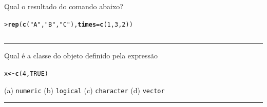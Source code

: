 \documentclass[a4paper,11pt,fleqn]{article}\usepackage[]{graphicx}\usepackage[]{color}
\makeatletter
\newcommand{\hlnum}[1]{\textcolor[rgb]{0,0,0}{#1}}%
\newcommand{\hlstr}[1]{\textcolor[rgb]{0,0,0}{#1}}%
\newcommand{\hlstd}[1]{\textcolor[rgb]{0,0,0}{#1}}%
\newcommand{\hlkwb}[1]{\textcolor[rgb]{0,0,0}{\textbf{#1}}}%
\newcommand{\hlkwc}[1]{\textcolor[rgb]{0,0,0}{\textbf{#1}}}%
\newcommand{\hlkwd}[1]{\textcolor[rgb]{0,0,0}{\textbf{#1}}}%
\newenvironment{kframe}{%
 \def\at@end@of@kframe{}%
 \ifinner\ifhmode%
  \def\at@end@of@kframe{\end{minipage}}%
  \begin{minipage}{\columnwidth}%
 \fi\fi%
 \def\FrameCommand##1{\hskip\@totalleftmargin \hskip-\fboxsep
 \colorbox{shadecolor}{##1}\hskip-\fboxsep
     \hskip-\linewidth \hskip-\@totalleftmargin \hskip\columnwidth}%
 \MakeFramed {\advance\hsize-\width
   \@totalleftmargin\z@ \linewidth\hsize
   \@setminipage}}%
 {\par\unskip\endMakeFramed%
 \at@end@of@kframe}
\newenvironment{knitrout}{}{} %
\theoremstyle{definition}
\makeatother
\begin{document}
\begin{compactenum}[3.]
\item Qual o resultado do comando abaixo?
\begin{knitrout}\small
{}\color{fgcolor}\begin{kframe}
\begin{alltt}
\hlstd{> }\hlkwd{rep}\hlstd{(}\hlkwd{c}\hlstd{(}\hlstr{"A"}\hlstd{,} \hlstr{"B"}\hlstd{,} \hlstr{"C"}\hlstd{),} \hlkwc{times} \hlstd{=} \hlkwd{c}\hlstd{(}\hlnum{1}\hlstd{,} \hlnum{3}\hlstd{,} \hlnum{2}\hlstd{))}
\end{alltt}
\end{kframe}
\end{knitrout}
\begin{tabular}{| p{1cm} | p{1cm} | p{1cm} | p{1cm} | p{1cm} | p{1cm}
  | p{1cm} | p{1cm} | p{1cm} | p{1cm} |}
  \hline
  & & & & & & & & & \\
  \hline
\end{tabular}
\end{compactenum}

\vspace{0.3cm}
\hrule
\vspace{0.3cm}

\begin{compactenum}[4.]
\item Qual é a classe do objeto definido pela expressão
\begin{knitrout}\small
{}\color{fgcolor}\begin{kframe}
\begin{alltt}
\hlstd{x} \hlkwb{<-} \hlkwd{c}\hlstd{(}\hlnum{4}\hlstd{,} \hlnum{TRUE}\hlstd{)}
\end{alltt}
\end{kframe}
\end{knitrout}
\begin{compactenum}
  \item[] (a) \texttt{numeric} \qquad (b) \texttt{logical} \qquad (c)
    \texttt{character} \qquad (d) \texttt{vector}
\end{compactenum}

\end{compactenum}

\vspace{0.3cm}
\hrule
\vspace{0.3cm}
\end{document}

